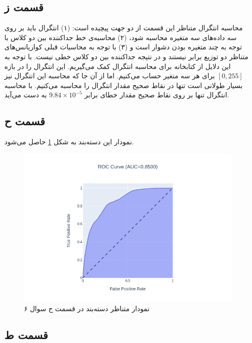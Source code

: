 \documentclass{article}
\begin{document}
\subsection*{قسمت ز}

محاسبه انتگرال متناظر این قسمت از دو جهت پیچیده است: (۱) انتگرال باید بر روی سه داده‌های سه متغیره محاسبه شود،
(۲) محاسبه‌ی خط جداکننده بین دو کلاس با توجه به چند متغیره بودن دشوار است و (۳) با توجه به محاسبات قبلی
کواریانس‌های متناظر دو توزیع برابر نیستند و در نتیجه جداکننده بین دو کلاس خطی نیست. با توجه به این دلایل از کتابخانه
 برای محاسبه انتگرال کمک می‌گیریم. این انتگرال را در بازه $[0,255]$ برای
هر سه متغیر حساب می‌کنیم. اما از آن جا که محاسبه این انتگرال نیز بسیار طولانی است تنها در نقاط صحیح
مقدار انتگرال را محاسبه می‌کنیم. با محاسبه انتگرال تنها بر روی نقاط صحیح مقدار خطای  برابر
$9.84 \times 10^{-5}$ به دست می‌آید.

\subsection*{قسمت ح}

نمودار  این دسته‌بند به شکل \ref{roc} حاصل می‌شود.

\begin{figure}[h]
    \centering
    \includegraphics[scale=0.3]{images/q6/roc.png}
    \caption{نمودار  متناظر دسته‌بند در قسمت ح سوال ۶}
    \label{roc}
\end{figure}

\subsection*{قسمت ط}
\end{document}
